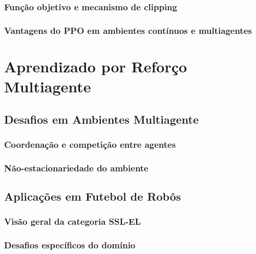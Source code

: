 \subsubsection{Função objetivo e mecanismo de clipping}
\label{subsubsec:ppo_objetivo}

\subsubsection{Vantagens do PPO em ambientes contínuos e multiagentes}
\label{subsubsec:ppo_vantagens}

\section{Aprendizado por Reforço Multiagente}
\label{sec:marl}

\subsection{Desafios em Ambientes Multiagente}
\label{subsec:desafios_multi}

\subsubsection{Coordenação e competição entre agentes}
\label{subsubsec:coordenacao}

\subsubsection{Não-estacionariedade do ambiente}
\label{subsubsec:nao_estacionariedade}

\subsection{Aplicações em Futebol de Robôs}
\label{subsec:futebol_robos}

\subsubsection{Visão geral da categoria SSL-EL}
\label{subsubsec:ssl_el}

\subsubsection{Desafios específicos do domínio}
\label{subsubsec:desafios_dominio}

